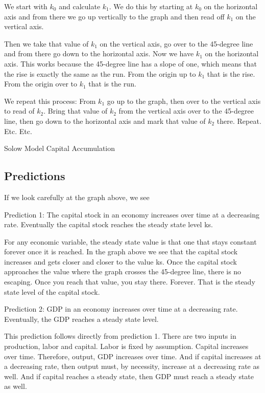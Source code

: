 \documentclass[
]{book}
\begin{document}
We start with \(k_0\) and calculate \(k_1\). We do this by starting at \(k_0\) on the horizontal axis and from there we go up vertically to the graph and then read off \(k_1\) on the vertical axis.

Then we take that value of \(k_1\) on the vertical axis, go over to the 45-degree line and from there go down to the horizontal axis. Now we have \(k_1\) on the horizontal axis. This works because the 45-degree line has a slope of one, which means that the rise is exactly the same as the run. From the origin up to \(k_1\) that is the rise. From the origin over to \(k_1\) that is the run.

We repeat this process: From \(k_1\) go up to the graph, then over to the vertical axis to read of \(k_2\). Bring that value of \(k_2\) from the vertical axis over to the 45-degree line, then go down to the horizontal axis and mark that value of \(k_2\) there.
Repeat.
Etc.
Etc.

Solow Model Capital Accumulation

\hypertarget{predictions}{%
\subsection{Predictions}\label{predictions}}

If we look carefully at the graph above, we see

Prediction 1: The capital stock in an economy increases over time at a decreasing rate. Eventually the capital stock reaches the steady state level ks.

For any economic variable, the steady state value is that one that stays constant forever once it is reached.
In the graph above we see that the capital stock increases and gets closer and closer to the value ks. Once the capital stock approaches the value where the graph crosses the 45-degree line, there is no escaping. Once you reach that value, you stay there. Forever. That is the steady state level of the capital stock.

Prediction 2: GDP in an economy increases over time at a decreasing rate. Eventually, the GDP reaches a steady state level.

This prediction follows directly from prediction 1. There are two inputs in production, labor and capital. Labor is fixed by assumption. Capital increases over time. Therefore, output, GDP increases over time. And if capital increases at a decreasing rate, then output must, by necessity, increase at a decreasing rate as well. And if capital reaches a steady state, then GDP must reach a steady state as well.
\end{document}
